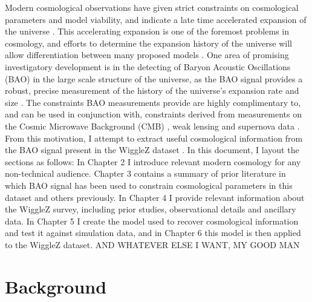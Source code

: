 \documentclass[titlesmallcaps, examinerscopy, copyrightpage]{uqthesis}
\newcommand{\red}{\color{red}}
\begin{document}
Modern cosmological observations have given strict constraints on cosmological parameters and model viability, and indicate a late time accelerated expansion of the universe \citep{RiessFilippenko1998, PerlmutterAldering1999, SpergelVerde2003, RiessStrolger2004, TegmarkBlanton2004, SanchezBaugh2006, SpergelBean2007, Komatsu2009, RiessMacri2009, PercivalReid2010, ReidPercival2010,BlakeKazin2011}. This accelerating expansion is one of the foremost problems in cosmology, and efforts to determine the expansion history of the universe will allow differentiation between many proposed models \citep{SanchezScoccola2012, AlbrechtBernstein2006}. One area of promising investigatory development is in the detecting of Baryon Acoustic Oscillations (BAO) in the large scale structure of the universe, as the BAO signal provides a robust, precise measurement of the history of the universe's expansion rate and size \citep{BlakeGlazebrook2003,HuHaiman2003,SeoEisenstein2003,Linder2003}. The constraints BAO measurements provide are highly complimentary to, and can be used in conjunction with, constraints derived from measurements on the Cosmic Microwave Background (CMB) \citep{BennettHalpern2003, Planck201416}, weak lensing \citep{VanWaerbeke2000,WittmanTyson2000,KaiserWilson2000} and supernova data \citep{BetouleKessler2014, KowalskiRubin2008}.\\

From this motivation, I attempt to extract useful cosmological information from the BAO signal present in the WiggleZ dataset \citep[WiggleZ;][]{Drinkwater2010}. In this document, I layout the sections as follows: In Chapter 2 I introduce relevant modern cosmology for any non-technical audience. Chapter 3 contains a summary of prior literature in which BAO signal has been used to constrain cosmological parameters in this dataset and others previously. In Chapter 4 I provide relevant information about the WiggleZ survey, including prior studies, observational details and ancillary data. In Chapter 5 I create the model used to recover cosmological information and test it against simulation data, and in Chapter 6 this model is then applied to the WiggleZ dataset. {\red AND WHATEVER ELSE I WANT, MY GOOD MAN}







\chapter{Background}
\label{ch:back}
\end{document}
